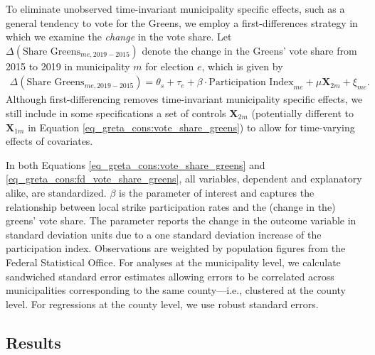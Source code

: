 To eliminate unobserved time-invariant municipality specific effects, such as a general tendency to vote for the Greens, we employ a first-differences strategy in which we examine the \textit{change} in the vote share. Let $\Delta(\text{Share Greens}_{me,2019-2015})$ denote the change in the Greens' vote share from 2015 to 2019 in municipality $m$ for election $e$, which is given by
\begin{align}
	\Delta(\text{Share Greens}_{me,2019-2015}) = \theta_s + \tau_e + \beta\cdot\text{Participation Index}_{me} + \mu \mathbf{X}_{2m} + \xi_{me}.\label{eq_greta_cons:fd_vote_share_greens}
\end{align}
Although first-differencing removes time-invariant municipality specific effects, we still include in some specifications a set of controls $\mathbf{X}_{2m}$ (potentially different to $\mathbf{X}_{1m}$ in Equation \ref{eq_greta_cons:vote_share_greens}) to allow for time-varying effects of covariates.


In both Equations \ref{eq_greta_cons:vote_share_greens} and \ref{eq_greta_cons:fd_vote_share_greens}, all variables, dependent and explanatory alike, are standardized. $\beta$ is the parameter of interest and captures the relationship between local strike participation rates and the (change in the) greens' vote share. The parameter reports the change in the outcome variable in standard deviation units due to a one standard deviation increase of the participation index. Observations are weighted by population figures from the Federal Statistical Office. For analyses at the municipality level, we calculate sandwiched standard error estimates allowing errors to be correlated across municipalities corresponding to the same county---i.e., clustered at the county level. For regressions at the county level, we use robust standard errors.





\subsection{Results}

